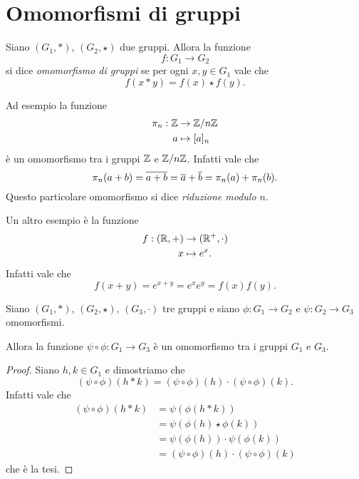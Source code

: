 \section{Omomorfismi di gruppi}

\begin{definition} \label{def:omo_gruppi}
    Siano $(G_1, *)$, $(G_2, \star)$ due gruppi. Allora la funzione \[
        f : G_1 \to G_2    
    \] si dice \emph{omomorfismo di gruppi} se per ogni $x, y \in G_1$ vale che \[
        f(x * y) = f(x) \star f(y).
    \]
\end{definition}

\begin{example}
    Ad esempio la funzione \begin{align*}
    \pi_n : \mathbb{Z} &\to \mathbb{Z}/n\mathbb{Z}\\
    a &\mapsto [a]_n
\end{align*} è un omomorfismo tra i gruppi $\mathbb{Z}$ e $\mathbb{Z}/n\mathbb{Z}$. Infatti vale che \[
    \pi_n(a + b) = \eqclass{a + b} = \eqclass a + \eqclass b = \pi_n(a) + \pi_n(b).
\] Questo particolare omomorfismo si dice \emph{riduzione modulo $n$}.
\end{example}

\begin{example}
    Un altro esempio è la funzione \begin{align*}
    f : (\mathbb{R}, +) &\to (\mathbb{R}^+, {\cdot})\\
    x &\mapsto e^x.
\end{align*} Infatti vale che \[
    f(x + y) = e^{x + y} = e^xe^y = f(x)f(y).    
\]
\end{example}

\begin{proposition}
     \label{prop:comp_omo}
    Siano $(G_1, *)$, $(G_2, \star)$, $(G_3, \cdot)$ tre gruppi e siano $\phi : G_1 \to G_2$ e $\psi : G_2 \to G_3$ omomorfismi.

    Allora la funzione $\psi \circ \phi : G_1 \to G_3$ è un omomorfismo tra i gruppi $G_1$ e $G_3$.
\end{proposition}
\begin{proof}
    Siano $h, k \in G_1$ e dimostriamo che \[
        (\psi \circ \phi)(h * k) = (\psi \circ \phi)(h) \cdot (\psi \circ \phi)(k).
    \] Infatti vale che
    \begin{align*}
        (\psi \circ \phi)(h * k) &= \psi(\phi(h * k)) \tag{$\phi$ omo.}\\
        &= \psi(\phi(h) \star \phi(k)) \tag{$\psi$ omo.}\\
        &= \psi(\phi(h)) \cdot \psi(\phi(k)) \\
        &= (\psi \circ \phi)(h) \cdot (\psi \circ \phi)(k)
    \end{align*}
    che è la tesi.
\end{proof}

